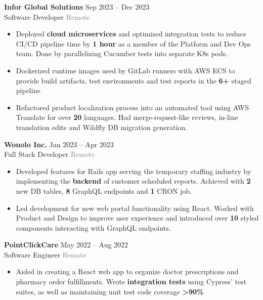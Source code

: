 \documentclass[10pt]{developercv} %
\begin{document}
\begin{minipage}[t]{\textwidth}
	\vspace{-\baselineskip}

	\textbf{Infor Global Solutions} \hfill Sep 2023 -- Dec 2023 \\
	Software Developer \hfill \textcolor{gray}{Remote}
	\begin{itemize}[noitemsep,topsep=0pt]
		\item Deployed \textbf{cloud microservices} and optimized integration tests to
		reduce CI/CD pipeline time by \textbf{1 hour} as a member of the Platform and Dev Ops team.
		Done by parallelizing Cucumber tests into separate K8s pods.
		\item Dockerized runtime images used by GitLab runners with AWS ECS to provide build artifacts, test 
		environments and test reports in the \textbf{6+} staged pipeline
		\item Refactored product localization process into an automated tool using
		AWS Translate for over \textbf{20} languages. Had merge-request-like reviews,
		in-line translation edits and Wildfly DB migration generation.
	\end{itemize}
	\vspace{0.3em}

	\textbf{Wonolo Inc.} \hfill Jan 2023 -- Apr 2023 \\
	Full Stack Developer \hfill \textcolor{gray}{Remote}
	\begin{itemize}[noitemsep,topsep=0pt]
		\item Developed features for Rails app serving the temporary staffing industry by implementing the
		\textbf{backend} of customer scheduled reports. Achieved with \textbf{2} new DB tables, \textbf{8} GraphQL endpoints and \textbf{1} CRON job.
		\item Led development for new web portal functionality using React. Worked with Product and Design to improve user
		experience and introduced over \textbf{10} styled components interacting with GraphQL endpoints.
	\end{itemize}
	\vspace{0.3em}

	\textbf{PointClickCare} \hfill May 2022 -- Aug 2022\\
	Software Engineer \hfill \textcolor{gray}{Remote}
	\begin{itemize}[noitemsep,topsep=0pt]
		\item Aided in creating a React web app to organize doctor prescriptions and pharmacy order fulfillments.
		Wrote \textbf{integration tests} using Cypress' test suites, as well as maintaining unit test code coverage \textbf{>90\%}
	\end{itemize}
	\vspace{0.3em}


\end{minipage}
\end{document}
